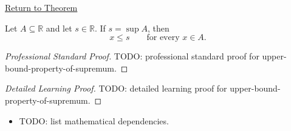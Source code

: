 \newpage
{}
\label{prf:upper-bound-property-of-supremum}

\begin{remark*}[Return]
\hyperref[prop:upper-bound-property-of-supremum]{Return to Theorem}
\end{remark*}

\begin{proposition*}
Let $A \subseteq \mathbb{R}$ and let $s \in \mathbb{R}$. If $s=\sup A$, then
\[
x \le s
\qquad \text{for every } x \in A.
\]
\end{proposition*}

\begin{proof}[Professional Standard Proof]
\LRAProofBodyStart
TODO: professional standard proof for upper-bound-property-of-supremum.
\end{proof}

\begin{proof}[Detailed Learning Proof]
\LRAProofBodyStart
TODO: detailed learning proof for upper-bound-property-of-supremum.
\end{proof}

\begin{remark*}
\end{remark*}

\begin{dependencies}
\begin{itemize}
  \item TODO: list mathematical dependencies.
\end{itemize}
\end{dependencies}

\clearpage

